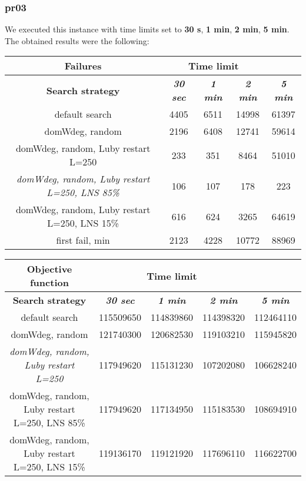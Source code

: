 \subsubsection{pr03}
We executed this instance with time limits set to \textbf{30 s}, \textbf{1 min}, \textbf{2 min}, \textbf{5 min}.\\
The obtained results were the following:
{
\renewcommand{\arraystretch}{2}
\begin{longtable}[h]{| c | c | c | c | c |}
    \hline
    \textbf{Failures} & \multicolumn{3}{c}{Time limit} & \\
    \hline
    \textbf{Search strategy} & \textbf{\textit{30 sec}} & \textbf{\textit{1 min}} & \textbf{\textit{2 min}} & \textbf{\textit{5 min}} \\
    \hline
    \endhead
    default search                                         &  4405 &  6511 & 14998 &  61397 \\
    \hline
    domWdeg, random                                        &  2196 &  6408 & 12741 &  59614 \\
    \hline
    domWdeg, random, Luby restart L=250                    &   233 &   351 &  8464 &  51010 \\
    \hline
    \textit{domWdeg, random, Luby restart L=250, LNS 85\%} &   106 &   107 &   178 &    223 \\
    \hline
    domWdeg, random, Luby restart L=250, LNS 15\%          &   616 &   624 &  3265 &  64619 \\
    \hline
    first fail, min                                        &  2123 &  4228 & 10772 &  88969 \\
    \hline
\end{longtable}
}

{
\renewcommand{\arraystretch}{2}
\begin{longtable}[h]{| c | c | c | c | c |}
    \hline
    \textbf{Objective function} & \multicolumn{3}{c}{Time limit} & \\
    \hline
    \textbf{Search strategy} & \textbf{\textit{30 sec}} & \textbf{\textit{1 min}} & \textbf{\textit{2 min}} & \textbf{\textit{5 min}} \\
    \hline
    \endhead
    default search                                & 115509650 & 114839860 & 114398320 & 112464110 \\
    \hline
    domWdeg, random                               & 121740300 & 120682530 & 119103210 & 115945820 \\
    \hline
    \textit{domWdeg, random, Luby restart L=250}  & 117949620 & 115131230 & 107202080 & 106628240 \\
    \hline
    domWdeg, random, Luby restart L=250, LNS 85\% & 117949620 & 117134950 & 115183530 & 108694910 \\
    \hline
    domWdeg, random, Luby restart L=250, LNS 15\% & 119136170 & 119121920 & 117696110 & 116622700 \\
    \hline
\end{longtable}
}